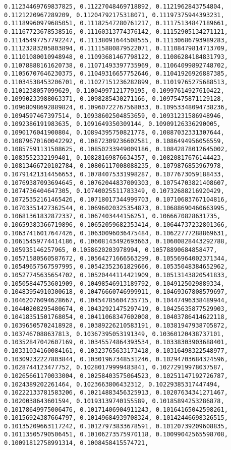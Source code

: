 \documentclass[11pt]{article}
\begin{document}
\begin{Verbatim}[commandchars=\\\{\}]
0.11234469769837825, 0.11227048469718892, 0.1121962843754804, 0.1121220967289209, 0.11204792175318071, 0.11197375944393231, 0.11189960979685051, 0.11182547280761217, 0.11175134847189661, 0.11167723678538516, 0.11160313774376142, 0.11152905134271121, 0.11145497757792247, 0.11138091644508555, 0.11130686793989283, 0.11123283205803894, 0.11115880879522071, 0.11108479814713709, 0.11101080010948948, 0.11093681467798122, 0.11086284184831793, 0.11078888161620738, 0.11071493397735969, 0.11064099892748702, 0.11056707646230375, 0.11049316657752646, 0.11041926926887385, 0.11034538453206701, 0.11027151236282899, 0.11019765275688513, 0.1101238057099629, 0.11004997121779195, 0.10997614927610422, 0.10990233988063371, 0.1098285430271166, 0.10975475871129128, 0.10968098692889824, 0.10960722767568033, 0.10953348094738236, 0.1094597467397514, 0.10938602504853659, 0.10931231586948946, 0.1092386191983635, 0.1091649350309144, 0.10909126336290005, 0.1090176041900804, 0.10894395750821778, 0.10887032331307644, 0.10879670160042292, 0.10872309236602581, 0.1086494956056559, 0.10857591131508625, 0.10850233949009186, 0.10842878012645002, 0.1083552332199401, 0.10828169876634357, 0.10820817676144423, 0.10813466720102784, 0.10806117008088235, 0.1079876853967978, 0.10791421314456653, 0.10784075331998287, 0.1077673059188433, 0.10769387093694645, 0.10762044837009303, 0.10754703821408607, 0.1074736404647305, 0.10740025511783349, 0.10732688216920429, 0.10725352161465426, 0.10718017344999703, 0.10710683767104816, 0.10703351427362544, 0.10696020325354873, 0.10688690460663995, 0.10681361832872337, 0.1067403444156251, 0.1066670828631735, 0.10659383366719896, 0.10652059682353414, 0.10644737232801366, 0.10637416017647426, 0.10630096036475484, 0.10622777288869631, 0.10615459774414186, 0.10608143492693663, 0.10600828443292788, 0.105935146257965, 0.1058620203978994, 0.10578890684858477, 0.10571580560587672, 0.10564271666563299, 0.10556964002371344, 0.10549657567597995, 0.10542352361829666, 0.10535048384652962, 0.10527745635654702, 0.10520444114421909, 0.10513143820541833, 0.10505844753601909, 0.10498546913189792, 0.1049125029889334, 0.10483954910300618, 0.10476660746999911, 0.10469367808579697, 0.10462076094628667, 0.10454785604735715, 0.10447496338489944, 0.10440208295480674, 0.10432921475297419, 0.10425635877529903, 0.10418351501768054, 0.10411068347602008, 0.10403786414622118, 0.10396505702418928, 0.10389226210583191, 0.10381947938705872, 0.1037467088637813, 0.10367395053191349, 0.10360120438737101, 0.10352847042607169, 0.10345574864393534, 0.10338303903688401, 0.10331034160084161, 0.10323765633173418, 0.10316498322548977, 0.10309232227803844, 0.10301967348531246, 0.10294703684324596, 0.1028744123477752, 0.10280179999483841, 0.10272919978037587, 0.10265661170033004, 0.10258403575064523, 0.10251147192726787, 0.1024389202261464, 0.1023663806432312, 0.10229385317447494, 0.10222133781583206, 0.10214883456325913, 0.10207634341271467, 0.1020038643601594, 0.10193139740155589, 0.10185894253286878, 0.10178649975006476, 0.10171406904911243, 0.10164165042598261, 0.10156924387664797, 0.10149684939708324, 0.10142446698326515, 0.10135209663117242, 0.10127973833678591, 0.10120739209608835, 0.10113505790506451, 0.10106273575970118, 0.10099042565598708, 0.10091812758991314, 0.1008458415574721, 
\end{Verbatim}
\end{document}
